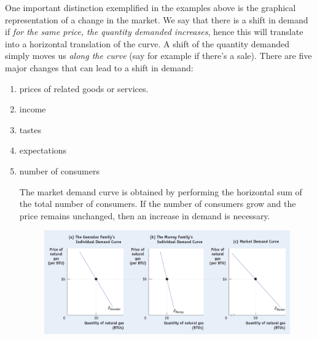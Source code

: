 \documentclass[english,course]{Notes}
\newcommand{\ita}[1]{\textit{#1}}
\begin{document}
		
	\par{One important distinction exemplified in the examples above is the graphical representation of a change in the market. We say that there is a shift in demand if \ita{for the same price, the quantity demanded increases}, hence this will translate into a horizontal translation of the curve. A shift of the quantity demanded simply moves us \ita{along the curve} (say for example if there's a sale). There are five major changes that can lead to a shift in demand:}
	\begin{enumerate}
	\item  prices of related goods or services. 
	
	
	\item income
	
	
	
	\item tastes
	\item expectations
	
	\item number of consumers
	
	
	\par{The market demand curve is obtained by performing the horizontal sum of the total number of consumers. If the number of consumers grow and the price remains unchanged, then an increase in demand is necessary.}
		\begin{figure}[ht]
\centering
\includegraphics[width=\textwidth]{demandIndividual}
\end{figure}

	\end{enumerate}
	
\end{document}
